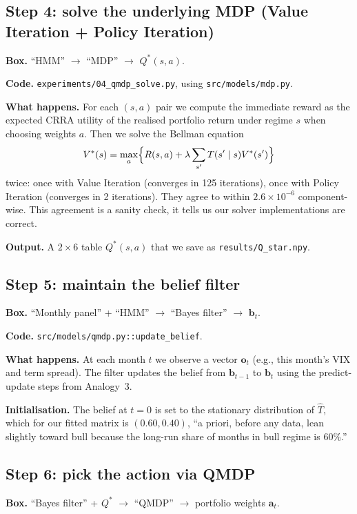 \documentclass[11pt]{article}
\newcommand{\bel}{\mathbf{b}}
\begin{document}
\subsection{Step 4: solve the underlying MDP (Value Iteration + Policy Iteration)}

\textbf{Box.} ``HMM'' $\to$ ``MDP'' $\to$ $Q^*(s, a)$.

\textbf{Code.} \texttt{experiments/04\_qmdp\_solve.py}, using \texttt{src/models/mdp.py}.

\textbf{What happens.} For each $(s, a)$ pair we compute the immediate reward as the expected CRRA utility of the realised portfolio return under regime $s$ when choosing weights $a$. Then we solve the Bellman equation
\[
V^*(s) = \max_a \Bigl\{ R(s, a) + \lambda \sum_{s'} T(s' \mid s) V^*(s') \Bigr\}
\]
twice: once with Value Iteration (converges in 125 iterations), once with Policy Iteration (converges in 2 iterations). They agree to within $2.6 \times 10^{-6}$ component-wise. This agreement is a sanity check, it tells us our solver implementations are correct.

\textbf{Output.} A $2 \times 6$ table $Q^*(s, a)$ that we save as \texttt{results/Q\_star.npy}.

\subsection{Step 5: maintain the belief filter}

\textbf{Box.} ``Monthly panel'' + ``HMM'' $\to$ ``Bayes filter'' $\to$ $\bel_t$.

\textbf{Code.} \texttt{src/models/qmdp.py::update\_belief}.

\textbf{What happens.} At each month $t$ we observe a vector $\mathbf{o}_t$ (e.g., this month's VIX and term spread). The filter updates the belief from $\bel_{t-1}$ to $\bel_t$ using the predict-update steps from Analogy~3.

\textbf{Initialisation.} The belief at $t = 0$ is set to the stationary distribution of $\hat T$, which for our fitted matrix is $(0.60, 0.40)$, ``a priori, before any data, lean slightly toward bull because the long-run share of months in bull regime is 60\%.''

\subsection{Step 6: pick the action via QMDP}

\textbf{Box.} ``Bayes filter'' + $Q^*$ $\to$ ``QMDP'' $\to$ portfolio weights $\mathbf{a}_t$.
\end{document}
